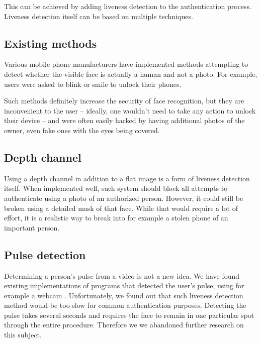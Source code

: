         This can be achieved by adding liveness detection to the authentication
        process. Liveness detection itself can be based on multiple techniques.

        \subsection*{Existing methods}
            Various mobile phone manufacturers have implemented methods attempting to
            detect whether the visible face is actually a human and not a photo.
            For example, users were asked to blink or smile to unlock their phones.

            Such methods definitely increase the security of face recognition,
            but they are inconvenient to the user -- ideally, one wouldn't need to take
            any action to unlock their device -- and were often easily hacked by having
            additional photos of the owner, even fake ones with the eyes being covered.

        \subsection*{Depth channel}
            Using a depth channel in addition to a flat image is a form of liveness
            detection itself.
            When implemented well, such system should block all attempts to authenticate
            using a photo of an authorized person.
            However, it could still be broken using a detailed mask of that face.
            While that would require a lot of effort, it is a realistic way to break
            into for example a stolen phone of an important person.

        \subsection*{Pulse detection}
            Determining a person's pulse from a video is not a new idea.
            We have found existing implementations of programs that detected the user's
            pulse, using for example a webcam \cite{pulsedetector}.
            Unfortunately, we found out that such liveness detection method would be
            too slow for common authentication purposes.
            Detecting the pulse takes several seconds and requires the face to remain
            in one particular spot through the entire procedure.
            Therefore we we abandoned further research on this subject.


